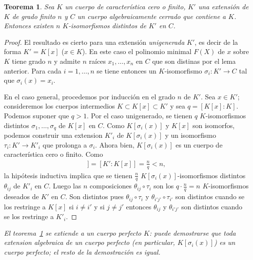 \documentclass[oneside,bibtotoc,leqno,spanish]{amsbook}
\newcommand{\QED}{}%
\renewcommand{\to}[1][]{\xrightarrow{#1}}
\numberwithin{equation}{section}
\newenvironment{comm}%
	{\begin{trivlist}\item\small\itshape}
	{\end{trivlist}}
\theoremstyle{defi}
\theoremstyle{note}
\newtheorem{theorem}{Teorema}
\theoremstyle{rem}
\numberwithin{theorem}{section}
\numberwithin{proposition}{section}
\numberwithin{definition}{section}
\numberwithin{lemma}{section}
\numberwithin{corollary}{section}
\numberwithin{example}{section}
\numberwithin{footnote}{section}%
\begin{document}
\begin{theorem}\label{teo2.4.1}
Sea $K$ un cuerpo de caracter\'istica cero o finito, $K'$ una extensi\'on de $K$ de grado finito $n$
y $C$ un cuerpo algebraicamente cerrado que contiene a $K$. Entonces existen $n$ $K$-isomorfismos distintos
de $K'$ en $C$.
\end{theorem}

\begin{proof}
El resultado es cierto para una extensi\'on {\em unigenerada} $K'$, es decir de la forma $K' = K[x]$
($x\in K$). En este caso el polinomio minimal $F(X)$ de $x$ sobre $K$ tiene grado $n$ y admite
$n$ ra\'ices $x_{1},\dots, x_{n}$ en $C$ que son distinas por el lema anterior. Para cada $i=1,\dots,n$ se
tiene entonces un $K$-isomorfismo $\sigma_{i}:K'\to C$ tal que $\sigma_{i}(x) = x_{i}$.

En el caso general, procedemos por inducci\'on en el grado $n$ de $K'$. Sea $x\in K'$; consideremos los cuerpos
intermedios $K\subset K[x]\subset K'$ y sea $q = [K[x]:K]$. Podemos suponer que $q > 1$. Por el caso unigenerado,
se tienen $q$ $K$-isomorfismos distintos $\sigma_{1},\dots,\sigma_{q}$ de $K[x]$ en $C$. Como
$K[\sigma_{i}(x)]$ y $K[x]$ son isomorfos, podemos construir una extension $K'_{i}$ de $K[\sigma_{i}(x)]$
y un isomorfismo $\tau_{i}:K'\to K'_{i}$ que prolonga a $\sigma_{i}$. Ahora bien, $K[\sigma_{i}(x)]$
es un cuerpo de caracter\'istica cero o finito. Como
\begin{gather*}
[K'_{i}:K[\sigma_{i}(x)]] = [K':K[x]] = \frac{n}{q} < n,
\end{gather*}
la hip\'otesis inductiva implica que se tienen $\frac{n}{q}$ $K[\sigma_{i}(x)]$-isomorfismos distintos
$\theta_{ij}$ de $K'_{i}$ en $C$. Luego las $n$ composiciones $\theta_{ij}\circ\tau_{i}$ son los
$q\cdot\frac{n}{q} = n$ $K$-isomorfismos deseados de $K'$ en $C$. Son distintos pues
$\theta_{ij}\circ\tau_{i}$ y $\theta_{i'j'}\circ\tau_{i'}$ son distintos cuando se los restringe a
$K[x]$ si $i\neq i'$ y si $j\neq j'$ entonces $\theta_{ij}$ y $\theta_{i'j'}$ son distintos cuando
se los restringe a $K'_{i}$. \QED
\end{proof}

\begin{comm}
El teorema~\ref{teo2.4.1} se extiende a un cuerpo perfecto $K$: puede demostrarse que
toda extension algebraica de
un cuerpo perfecto (en particular, $K[\sigma_{i}(x)]$) es un cuerpo perfecto; el resto de
la demostraci\'on es igual.
\end{comm}
\end{document}
